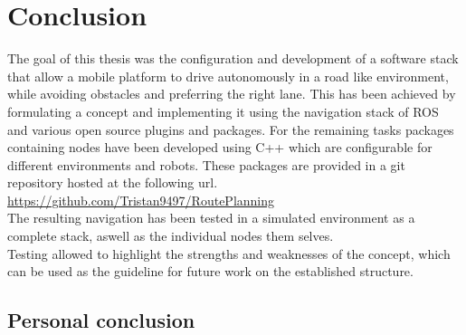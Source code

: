 \chapter{Conclusion}
\label{Conclusion}
The goal of this thesis was the configuration and development of a software stack that allow a mobile platform to drive autonomously in a road like environment, while avoiding obstacles and preferring the right lane.
This has been achieved by formulating a concept and implementing it using the navigation stack of ROS and various open source plugins and packages.
For the remaining tasks packages containing nodes have been developed using C++ which are configurable for different environments and robots. These packages are provided in a git repository hosted at the following url.\\

\url{https://github.com/Tristan9497/RoutePlanning}\\

The resulting navigation has been tested in a simulated environment as a complete stack, aswell as the individual nodes them selves.\\
Testing allowed to highlight the strengths and weaknesses of the concept, which can be used as the guideline for future work on the established structure.

\section{Personal conclusion}





